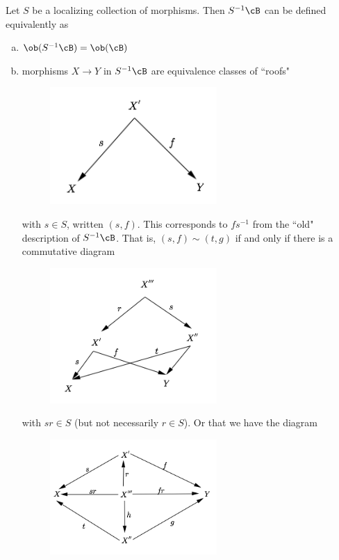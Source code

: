 \begin{prop}
Let $S$ be a localizing collection of morphisms. Then $S^{-1}\cB$ can be defined equivalently as 
\begin{enumerate}[(a)]
\item $\ob(S^{-1}\cB)=\ob(\cB)$
\item morphisms $X \to Y$ in $S^{-1}\cB$ are equivalence classes of ``roofs" 

\begin{figure}[H] 
   \centering
   \includegraphics[width=2.5in]{images/p2.png} 
\end{figure}

with $s \in S$, written $(s,f)$. This corresponds to $fs^{-1}$ from the ``old" description of $S^{-1}\cB$. That is, $(s,f) \sim (t,g)$ if and only if there is a commutative diagram


\begin{figure}[H] 
   \centering
   \includegraphics[width=2.5in]{images/p3.png} 
\end{figure}

with $sr \in S$ (but not necessarily $r \in S$). Or that we have the diagram 

\begin{figure}[H] 
   \centering
   \includegraphics[width=2.5in]{images/p4.png} 
\end{figure}


\end{enumerate}
\end{prop}
